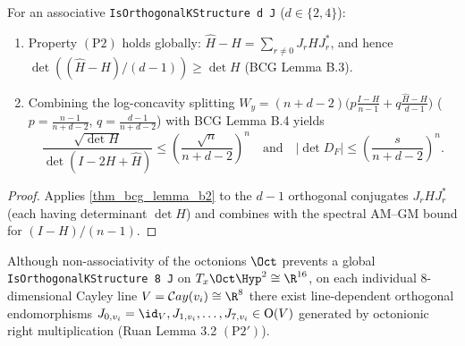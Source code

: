 \begin{theorem}
\label{thm_associative_rank_one}
\leanok
{}
For an associative \texttt{IsOrthogonalKStructure d J} ($d \in \{2, 4\}$):
\begin{enumerate}
\item Property $\mathrm{(P2)}$ holds globally: $\widehat{H} - H = \sum_{r \ne 0} J_r H J_r^*$, and hence $\det((\widehat{H} - H)/(d - 1)) \ge \det H$ (BCG Lemma B.3).
\item Combining the log-concavity splitting $W_y = (n+d-2)\bigl(p\frac{I-H}{n-1} + q\frac{\widehat{H}-H}{d-1}\bigr)$ ($p = \frac{n-1}{n+d-2}$, $q = \frac{d-1}{n+d-2}$) with BCG Lemma B.4 yields
$$\frac{\sqrt{\det H}}{\det(I - 2H + \widehat{H})} \le \left(\frac{\sqrt{n}}{n + d - 2}\right)^n \quad\text{and}\quad |\det D_F| \le \left(\frac{s}{n + d - 2}\right)^n.$$
\end{enumerate}
\end{theorem}
\begin{proof}\leanok Applies \cref{thm_bcg_lemma_b2} to the $d - 1$ orthogonal conjugates $J_r H J_r^*$ (each having determinant $\det H$) and combines with the spectral AM--GM bound for $(I - H)/(n - 1)$.\end{proof}

\begin{definition}
\label{def_local_cayley_structure}
\leanok
{}
Although non-associativity of the octonions $\Oct$ prevents a global \texttt{IsOrthogonalKStructure 8 J} on $T_x \Oct\Hyp^2 \cong \R^{16}$, on each individual $8$-dimensional Cayley line $V = \mathcal{C}ay(v_i) \cong \R^8$ there exist line-dependent orthogonal endomorphisms $J_{0,v_i} = \id_V, J_{1,v_i}, \dots, J_{7,v_i} \in \mathrm{O}(V)$ generated by octonionic right multiplication (Ruan Lemma 3.2 $\mathrm{(P2')}$).
\end{definition}


